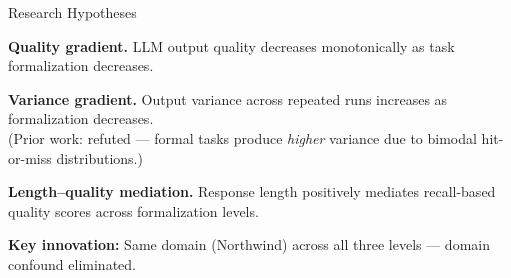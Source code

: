 \documentclass[aspectratio=169]{beamer}
\begin{document}
\begin{frame}{Research Hypotheses}

\begin{description}[H3:]
    \item[H1:] \textbf{Quality gradient.} LLM output quality decreases monotonically as task formalization decreases.
    \vspace{0.5em}
    \item[H2:] \textbf{Variance gradient.} Output variance across repeated runs increases as formalization decreases.\\
    {\small\color{gray} (Prior work: refuted --- formal tasks produce \emph{higher} variance due to bimodal hit-or-miss distributions.)}
    \vspace{0.5em}
    \item[H3:] \textbf{Length--quality mediation.} Response length positively mediates recall-based quality scores across formalization levels.
\end{description}

\vspace{1em}
\textbf{Key innovation:} Same domain (Northwind) across all three levels --- domain confound eliminated.

\end{frame}
\end{document}
